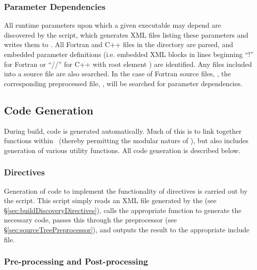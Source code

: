 \subsubsection{Parameter Dependencies}\label{sec:parameterDependencies}

All runtime parameters upon which a given executable may depend are discovered by the  script, which generates XML files listing these parameters and writes them to . All Fortran and C++ files in the  directory are parsed, and embedded parameter definitions (i.e. embedded XML blocks in lines beginning ``!\@'' for Fortran or ``//\@'' for C++ with root element ) are identified. Any files included into a source file are also searched. In the case of Fortran source files, , the corresponding preprocessed file, , will be searched for parameter dependencies.

\subsection{Code Generation}

During build, code is generated automatically. Much of this is to link together functions within \glc\ (thereby permitting the modular nature of \glc), but also includes generation of various utility functions. All code generation is described below.

\subsubsection{Directives}\label{sec:codeBuildIncludeDirectives}

Generation of code to implement the functionality of  directives is carried out by the  script. This script simply reads an XML file generated by the  (see \S\ref{sec:buildDiscoveryDirectives}), calls the appropriate function to generate the necessary code, passes this through the preprocessor (see \S\ref{sec:sourceTreePreprocessor}), and outputs the result to the appropriate include file.

\subsubsection{Pre-processing and Post-processing}\label{sec:codeBuildPrePostProcess}

